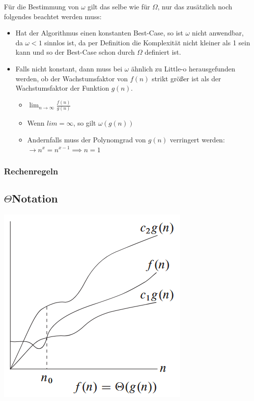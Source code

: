 \documentclass[
../../AuD-Zusammenfassung.tex,
]
{subfiles}
\begin{document}
Für die Bestimmung von $\omega$ gilt das selbe wie für $\Omega$, nur das zusätzlich noch folgendes beachtet werden muss: 
\begin{itemize}
    \item Hat der Algorithmus einen konstanten Best-Case, so ist $\omega$ nicht anwendbar, da $\omega < 1$ sinnlos ist, da per Definition die Komplexität nicht kleiner als 1 sein kann und so der Best-Case schon durch $\Omega$ definiert ist. 
    \item Falls nicht konstant, dann muss bei $\omega$ ähnlich zu Little-o herausgefunden werden, ob der Wachstumsfaktor von $f(n)$ strikt größer ist als der Wachstumsfaktor der Funktion $g(n)$.
    \begin{itemize}
        \item $\lim_{n \to \infty}\frac{f(n)}{g(n)}$
        \item Wenn $lim = \infty$, so gilt $\omega(g(n))$
        \item Andernfalls muss der Polynomgrad von $g(n)$ verringert werden:\\
        $\longrightarrow n^x = n^{x - 1} \implies n = 1$
    \end{itemize}
\end{itemize}

\subsubsection{Rechenregeln}
\newpage 
\subsection{$\Theta$\space Notation}

\begin{center}
    \includegraphics[scale=0.6]{Pics/LandauNotation.png}
\end{center}
\end{document}
